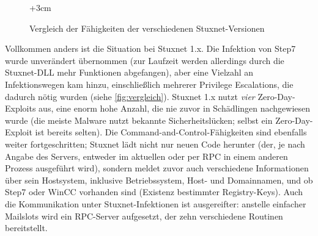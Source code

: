 \documentclass[a4paper]{article}
\begin{document}
\begin{figure}
  \begin{adjustwidth}{-3cm}{+3cm}
  \end{adjustwidth}
  \caption{Vergleich der Fähigkeiten der verschiedenen Stuxnet-Versionen\label{fig:vergleich}}
\end{figure}

Vollkommen anders ist die Situation bei Stuxnet 1.x.
Die Infektion von Step7 wurde unverändert übernommen (zur Laufzeit werden allerdings durch die Stuxnet-DLL mehr Funktionen abgefangen),
aber eine Vielzahl an Infektionswegen kam hinzu, einschließlich mehrerer Privilege Escalations, die dadurch nötig wurden (siehe \autoref{fig:vergleich}).
Stuxnet 1.x nutzt \emph{vier} Zero-Day-Exploits aus, eine enorm hohe Anzahl, die nie zuvor in Schädlingen nachgewiesen wurde
(die meiste Malware nutzt bekannte Sicherheitslücken; selbst ein Zero-Day-Exploit ist bereits selten).
Die Command-and-Control-Fähigkeiten sind ebenfalls weiter fortgeschritten;
Stuxnet lädt nicht nur neuen Code herunter (der, je nach Angabe des Servers, entweder im aktuellen oder per RPC in einem anderen Prozess ausgeführt wird),
sondern meldet zuvor auch verschiedene Informationen über sein Hostsystem,
inklusive Betriebssystem, Host- und Domainnamen, und ob Step7 oder WinCC vorhanden sind (Existenz bestimmter Registry-Keys).
Auch die Kommunikation unter Stuxnet-Infektionen ist ausgereifter:
anstelle einfacher Mailslots wird ein RPC-Server aufgesetzt, der zehn verschiedene Routinen bereitstellt. %
\end{document}

